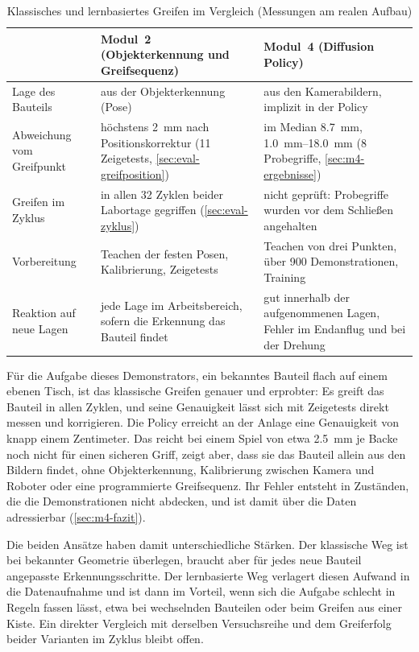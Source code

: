 \begin{table}[htbp]
  \centering
  \caption[Klassisches und lernbasiertes Greifen im Vergleich]{Klassisches und lernbasiertes
  Greifen im Vergleich (Messungen am realen Aufbau)}
  \label{tab:eval-vergleich}
  \begin{tabularx}{\textwidth}{@{}l X X@{}}
    \toprule
    & Modul~2 (Objekterkennung und Greifsequenz) & Modul~4 (Diffusion Policy) \\
    \midrule
    Lage des Bauteils & aus der Objekterkennung (Pose) & aus den Kamerabildern, implizit
      in der Policy \\
    Abweichung vom Greifpunkt & höchstens \SI{2}{\milli\metre} nach Positionskorrektur
      (11 Zeigetests, \cref{sec:eval-greifposition}) & im Median \SI{8.7}{\milli\metre},
      \SIrange{1.0}{18.0}{\milli\metre} (8 Probegriffe, \cref{sec:m4-ergebnisse}) \\
    Greifen im Zyklus & in allen 32 Zyklen beider Labortage gegriffen (\cref{sec:eval-zyklus})
      & nicht geprüft: Probegriffe wurden vor dem Schließen angehalten \\
    Vorbereitung & Teachen der festen Posen, Kalibrierung, Zeigetests & Teachen von drei
      Punkten, über 900 Demonstrationen, Training \\
    Reaktion auf neue Lagen & jede Lage im Arbeitsbereich, sofern die Erkennung das Bauteil
      findet & gut innerhalb der aufgenommenen Lagen, Fehler im Endanflug und bei der Drehung \\
    \bottomrule
  \end{tabularx}
\end{table}

Für die Aufgabe dieses Demonstrators, ein bekanntes Bauteil flach auf einem ebenen Tisch, ist das
klassische Greifen genauer und erprobter: Es greift das Bauteil in allen Zyklen, und seine
Genauigkeit lässt sich mit Zeigetests direkt messen und korrigieren. Die Policy erreicht an der
Anlage eine Genauigkeit von knapp einem Zentimeter. Das reicht bei einem Spiel von etwa
\SI{2.5}{\milli\metre} je Backe noch nicht für einen sicheren Griff, zeigt aber, dass sie das
Bauteil allein aus den Bildern findet, ohne Objekterkennung, Kalibrierung zwischen Kamera und
Roboter oder eine programmierte Greifsequenz. Ihr Fehler entsteht in Zuständen, die die
Demonstrationen nicht abdecken, und ist damit über die Daten adressierbar
(\cref{sec:m4-fazit}).

Die beiden Ansätze haben damit unterschiedliche Stärken. Der klassische Weg ist bei bekannter
Geometrie überlegen, braucht aber für jedes neue Bauteil angepasste Erkennungsschritte. Der
lernbasierte Weg verlagert diesen Aufwand in die Datenaufnahme und ist dann im Vorteil, wenn
sich die Aufgabe schlecht in Regeln fassen lässt, etwa bei wechselnden Bauteilen oder beim Greifen
aus einer Kiste. Ein direkter Vergleich mit derselben Versuchsreihe und dem Greiferfolg beider
Varianten im Zyklus bleibt offen.

